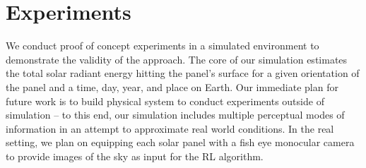 \documentclass[11pt]{article}
\begin{document}

\section{Experiments}

We conduct proof of concept experiments in a simulated environment to demonstrate the validity of the approach. The core of our simulation estimates the total solar radiant energy hitting the panel's surface for a given orientation of the panel and a time, day, year, and place on Earth. Our immediate plan for future work is to build physical system to conduct experiments outside of simulation -- to this end, our simulation includes multiple perceptual modes of information in an attempt to approximate real world conditions. In the real setting, we plan on equipping each solar panel with a fish eye monocular camera to provide images of the sky as input for the RL algorithm.%
\end{document}
